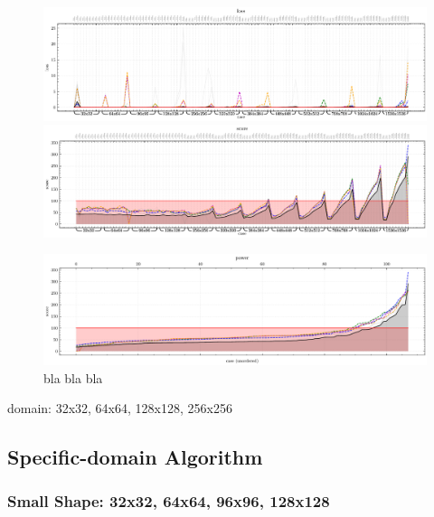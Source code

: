 \documentclass[format=acmsmall,screen,review,authordraft,nonacm]{acmart}
\begin{document}
\begin{figure}[H]
	\centering
	\includegraphics[width=\linewidth]{../figures/figure-2-loss}
	\includegraphics[width=\linewidth]{../figures/figure-3-score}

	\includegraphics[width=\linewidth]{../figures/figure-4-power}
	\caption{bla bla bla}
	\label{fig:abstract}
\end{figure}

\begin{table}[H]
	\centering
	
	\newline
	\caption{domain: 32x32, 64x64, 128x128, 256x256}
\end{table}

\subsection{Specific-domain Algorithm} %

\subsubsection{Small Shape: 32x32, 64x64, 96x96, 128x128}
\end{document}
